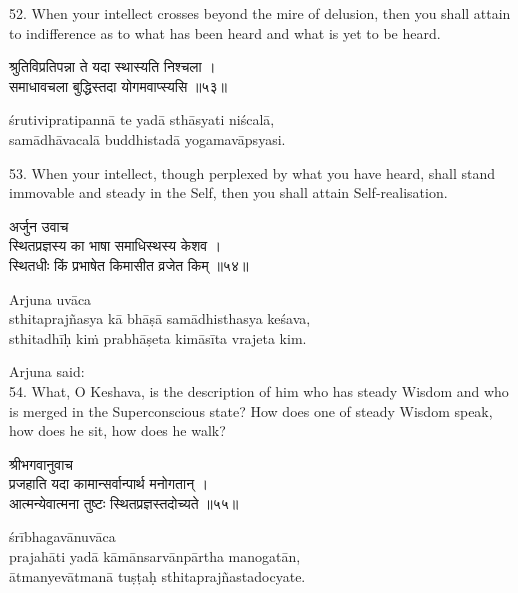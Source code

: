 52. When your intellect crosses beyond the mire of delusion, then you shall
attain to indifference as to what has been heard and what is yet to be heard.

\begin{gitaverse}
श्रुतिविप्रतिपन्ना ते यदा स्थास्यति निश्चला । \\
समाधावचला बुद्धिस्तदा योगमवाप्स्यसि ॥५३॥
\end{gitaverse}

\begin{transliteration}
śrutivipratipannā te yadā sthāsyati niścalā, \\
samādhāvacalā buddhistadā yogamavāpsyasi.
\end{transliteration}

53. When your intellect, though perplexed by what you have heard, shall stand
immovable and steady in the Self, then you shall attain Self-realisation.

\begin{gitaverse}
अर्जुन उवाच \\
स्थितप्रज्ञस्य का भाषा समाधिस्थस्य केशव । \\
स्थितधीः किं प्रभाषेत किमासीत व्रजेत किम् ॥५४॥
\end{gitaverse}

\begin{transliteration}
Arjuna uvāca \\
sthitaprajñasya kā bhāṣā samādhisthasya keśava, \\
sthitadhīḥ kiṁ prabhāṣeta kimāsīta vrajeta kim.
\end{transliteration}

Arjuna said: \\
54. What, O Keshava, is the description of him who has steady Wisdom and who is
merged in the Superconscious state? How does one of steady Wisdom speak, how
does he sit, how does he walk?

\begin{gitaverse}
श्रीभगवानुवाच \\
प्रजहाति यदा कामान्सर्वान्पार्थ मनोगतान् । \\
आत्मन्येवात्मना तुष्टः स्थितप्रज्ञस्तदोच्यते ॥५५॥
\end{gitaverse}

\begin{transliteration}
śrībhagavānuvāca \\
prajahāti yadā kāmānsarvānpārtha manogatān, \\
ātmanyevātmanā tuṣṭaḥ sthitaprajñastadocyate.
\end{transliteration}

